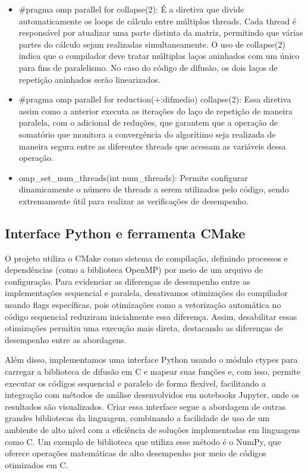 \documentclass[12pt]{article}
\begin{document}
\begin{itemize}
    \item \#pragma omp parallel for collapse(2): É a diretiva que divide automaticamente os loops de cálculo entre múltiplos threads. Cada thread é responsável por atualizar uma parte distinta da matriz, permitindo que várias partes do cálculo sejam realizadas simultaneamente. O uso de collapse(2) indica que o compilador deve tratar múltiplas laços aninhados com um único para fins de paralelismo. No caso do código de difusão, os dois laços de repetição aninhados serão linearizados.
    \item \#pragma omp parallel for reduction(+:difmedio) collapse(2): Essa diretiva assim como a anterior executa as iterações do laço de repetição de maneira paralela, com o adicional de reduções, que garantem que a operação de somatório que monitora a convergência do algorítimo seja realizada de maneira segura entre as diferentes threads que acessam as variáveis dessa operação.
    \item omp\_set\_num\_threads(int num\_threads): Permite configurar dinamicamente o número de threads a serem utilizados pelo código, sendo extremamente útil para realizar as verificações de desempenho.
\end{itemize}

\subsection{Interface Python e ferramenta CMake}

O projeto utiliza o CMake como sistema de compilação, definindo processos e dependências (como a biblioteca OpenMP) por meio de um arquivo de configuração. Para evidenciar as diferenças de desempenho entre as implementações sequencial e paralela, desativamos otimizações do compilador usando flags específicas, pois otimizações como a vetorização automática no código sequencial reduziram inicialmente essa diferença. Assim, desabilitar essas otimizações permitiu uma execução mais direta, destacando as diferenças de desempenho entre as abordagens.

Além disso, implementamos uma interface Python usando o módulo ctypes para carregar a biblioteca de difusão em C e mapear suas funções e, com isso, permite executar os códigos sequencial e paralelo de forma flexível, facilitando a integração com métodos de análise desenvolvidos em notebooks Jupyter, onde os resultados são visualizados. Criar essa interface segue a abordagem de outras grandes bibliotecas da linguagem, combinando a facilidade de uso de um ambiente de alto nível com a eficiência de soluções implementadas em linguagens como C. Um exemplo de biblioteca que utiliza esse método é o NumPy, que oferece operações matemáticas de alto desempenho por meio de códigos otimizados em C.
\end{document}
